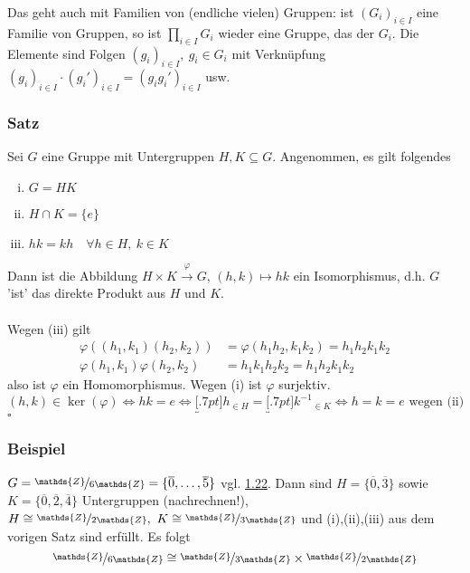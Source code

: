 Das geht auch mit Familien von (endliche vielen) Gruppen: 
ist $(G_i)_{i\in I}$ eine Familie von Gruppen, so ist $\prod\limits_{i\in I}G_i$ wieder eine Gruppe, das  der $G_i$. 
Die Elemente sind Folgen $(g_i)_{i\in I},~g_i\in G_i$ mit Verknüpfung $(g_i)_{i\in I}\cdot (g_i')_{i\in I}=(g_ig_i')_{i\in I}$ usw.\\

\subsubsection*{Satz}
Sei $G$ eine Gruppe mit Untergruppen $H,K\subseteq G$.
Angenommen, es gilt folgendes
\begin{enumerate}[(i)]
	\item $G=HK$
	\item $H\cap K=\{e\}$
	\item $hk=kh\quad \forall h\in H,~k\in K$
\end{enumerate}
Dann ist die Abbildung $H\times K \stackrel{\varphi}{\to} G$, $(h,k)\mapsto hk$ ein Isomorphismus, d.h. $G$ 'ist' das direkte Produkt aus $H$ und $K$.\\

\\
Wegen (iii) gilt
\begin{equation*}
\begin{aligned}
	\varphi((h_1,k_1)(h_2,k_2)) &= \varphi(h_1h_2,k_1k_2)=h_1h_2k_1k_2\\
	\varphi(h_1,k_1)\varphi(h_2,k_2) &= h_1k_1h_2k_2=h_1h_2k_1k_2
\end{aligned}
\end{equation*}
also ist $\varphi$ ein Homomorphismus. 
Wegen (i) ist $\varphi$ surjektiv.
\[
(h,k)\in \ker(\varphi) \Leftrightarrow hk=e \Leftrightarrow \underbracket[.7pt]{h}_{\in H}=\underbracket[.7pt]{k^{-1}}_{\in K} \Leftrightarrow h=k=e \text{ wegen (ii)}
\]
\hfill $\square$

\subsubsection*{Beispiel}
$G=\nicefrac{\mathds{Z}}{6\mathds{Z}}=\{\overline{0},\dots,\overline{5}\}$ vgl. \hyperref[sub:satz_eigenschaften]{1.22}.
Dann sind $H=\{\overline{0},\overline{3}\}$ sowie $K=\{\overline{0},\overline{2},\overline{4}\}$ Untergruppen (nachrechnen!), $H\cong \nicefrac{\mathds{Z}}{2\mathds{Z}},~K\cong \nicefrac{\mathds{Z}}{3\mathds{Z}}$ und (i),(ii),(iii) aus dem vorigen Satz sind erfüllt. 
Es folgt
\[
\nicefrac{\mathds{Z}}{6\mathds{Z}}\cong \nicefrac{\mathds{Z}}{3\mathds{Z}}\times \nicefrac{\mathds{Z}}{2\mathds{Z}} 
\]

